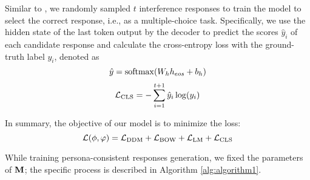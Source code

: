 \documentclass[letterpaper]{article} \usepackage{aaai23}  \usepackage{times}  \usepackage{helvet}  \usepackage{courier}  \usepackage[hyphens]{url}  \usepackage{graphicx} \urlstyle{rm} \def\UrlFont{\rm}  \usepackage{natbib}  \usepackage{caption} \frenchspacing  \setlength{\pdfpagewidth}{8.5in}  \setlength{\pdfpageheight}{11in}  \usepackage{algorithm}
\begin{document}
Similar to \cite{Wolf2019}, we randomly sampled $t$ interference responses to train the model to select the correct response, i.e., as a multiple-choice task. Specifically, we use the hidden state of the last token output by the decoder to predict the scores ${\hat y_i}$ of each candidate response and calculate the cross-entropy loss with the ground-truth label ${y_i}$, denoted as
\begin{equation}
\hat y = {\mathop{\rm softmax}\nolimits} ({W_h}{h_{eos}} + {b_h})
\label{eq17}
\end{equation}
\begin{equation}
{{\cal L}_{{\rm{CLS}}}} =  - \sum\limits_{i = 1}^{t+1} {{{\hat y}_i}\log ({y_i})}
\label{eq18}
\end{equation}

In summary, the objective of our model is to minimize the loss:
\begin{equation}
{\cal L}(\phi ,\varphi ) = {{\cal L}_{{\rm{DDM}}}} + {{\cal L}_{{\rm{BOW}}}} + {{\cal L}_{{\rm{LM}}}} + {{\cal L}_{{\rm{CLS}}}}
\label{eq19}
\end{equation}

While training persona-consistent responses generation, we fixed the parameters of ${\bf{M}}$; the specific process is described in Algorithm \ref{alg:algorithm1}.
\end{document}
